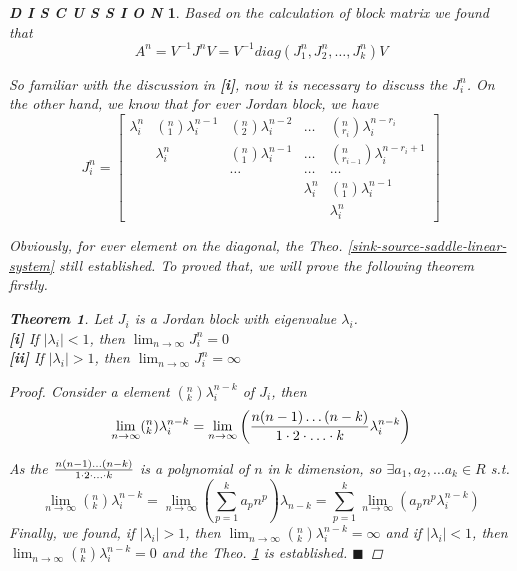 \documentclass[12pt]{article}
\theoremstyle{plain}
\newtheorem{theorem}{\textbf{Theorem}}[section]
\newtheorem{proof}{\textit{PROOF}}[section]
\newtheorem{discussion}{\textit{D I S C U S S I O N}}[section]
\begin{document}
\begin{discussion}
Based on the calculation of block matrix we found that
$$
A^n = V^{-1} J^n V = V^{-1} diag(J_1^n, J_2^n, \ldots, J_k^n) V
$$

So familiar with the discussion in \textbf{[i]}, now it is necessary to discuss the $J_i^n$. On the other hand, we know that for ever Jordan block, we have
$$
J_i^n = \left[
\begin{array}{ccccc}
\lambda_i^n & (^n_1)\lambda_i^{n-1} & (^n_2)\lambda_i^{n-2} & \ldots      & (^n_{r_i})\lambda_i^{n-r_i}        \\
            & \lambda_i^n           & (^n_1)\lambda_i^{n-1} & \ldots      & (^n_{r_{i-1}})\lambda_i^{n-r_i+1}  \\
            &                       & \ldots                & \ldots      & \ldots                             \\
            &                       &                       & \lambda_i^n & (^n_1)\lambda_i^{n-1}              \\
            &                       &                       &             & \lambda_i^n
\end{array} \right]
$$ 

Obviously, for ever element on the diagonal, the Theo. \ref{sink-source-saddle-linear-system} still established. To proved that, we will prove the following theorem firstly.

\begin{theorem} \label{exp_Jordan}Let $J_i$ is a Jordan block with eigenvalue $\lambda_i$. 
\\\noindent \textbf{[i]} If $|\lambda_i| < 1$, then $\lim_{n \rightarrow \infty} J_i^n = 0$
\\\noindent \textbf{[ii]} If $|\lambda_i| > 1$, then $\lim_{n \rightarrow \infty} J_i^n = \infty$
\end{theorem}
{\color{blue}
\begin{proof} Consider a element $(^n_k)\lambda_i^{n-k}$ of $J_i$, then 
$$
\lim_{n \rightarrow \infty}(^n_k)\lambda_i^{n-k} = \lim_{n \rightarrow \infty}\left({n(n-1)\ldots(n-k) \over 1\cdot 2 \cdot \ldots \cdot k} \lambda_i^{n-k}\right)
$$

As the ${n(n-1)\ldots(n-k) \over 1\cdot 2 \cdot \ldots \cdot k}$ is a polynomial of $n$ in $k$ dimension, so $\exists a_1, a_2, \ldots a_k \in R$ s.t. 
$$
\lim_{n \rightarrow \infty}(^n_k)\lambda_i^{n-k} = \lim_{n \rightarrow \infty}\left(\sum_{p = 1}^{k} a_p n^p\right)\lambda_{n - k} = \sum_{p = 1}^{k} \lim_{n \rightarrow \infty}(a_p n^p \lambda_i^{n-k})
$$
Finally, we found, if $|\lambda_i| > 1$, then $\lim_{n \rightarrow \infty}(^n_k)\lambda_i^{n-k} = \infty$ and if $|\lambda_i| < 1$, then $\lim_{n \rightarrow \infty}(^n_k)\lambda_i^{n-k} = 0$ and the Theo. \ref{exp_Jordan} is established. $\blacksquare$
\end{proof}
}

\end{discussion}
\end{document}
